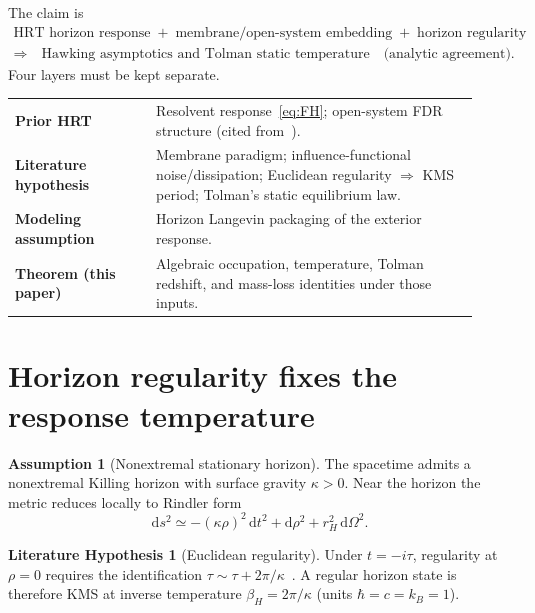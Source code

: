 \documentclass[11pt]{article}
\theoremstyle{definition}
\newtheorem{assumption}[theorem]{Assumption}
\newtheorem{literaturehypothesis}[theorem]{Literature Hypothesis}
\theoremstyle{remark}
\newcommand{\dd}{\mathrm{d}}
\begin{document}
The claim is
\begin{equation}
\label{eq:claim}
\boxed{\begin{gathered}
\text{HRT horizon response}
\;+\;
\text{membrane/open-system embedding}
\;+\;
\text{horizon regularity}\\
\Longrightarrow\quad
\text{Hawking asymptotics and Tolman static temperature}
\quad\text{(analytic agreement).}
\end{gathered}}
\end{equation}
Four layers must be kept separate.
\begin{center}
\begin{tabular}{@{}>{\bfseries}p{0.28\linewidth}p{0.64\linewidth}@{}}
\toprule
Prior HRT & Resolvent response~\eqref{eq:FH}; open-system FDR structure
(cited from~\cite{boyd2026response}).\\
Literature hypothesis & Membrane paradigm; influence-functional noise/dissipation;
Euclidean regularity $\Rightarrow$ KMS period; Tolman's static equilibrium law.\\
Modeling assumption & Horizon Langevin packaging of the exterior response.\\
Theorem (this paper) & Algebraic occupation, temperature, Tolman redshift, and
mass-loss identities under those inputs.\\
\bottomrule
\end{tabular}
\end{center}

\section{Horizon regularity fixes the response temperature}
\label{sec:geometry}
\begin{assumption}[Nonextremal stationary horizon]
\label{ass:horizon}
The spacetime admits a nonextremal Killing horizon with surface gravity $\kappa>0$.
Near the horizon the metric reduces locally to Rindler form
\begin{equation}
\label{eq:rindler}
\dd s^2\simeq-(\kappa\rho)^2\,\dd t^2+\dd\rho^2+r_H^2\,\dd\Omega^2.
\end{equation}
\end{assumption}

\begin{literaturehypothesis}[Euclidean regularity]
\label{lit:period}
Under $t=-i\tau$, regularity at $\rho=0$ requires the identification
$\tau\sim\tau+2\pi/\kappa$~\cite{Hawking1975,Unruh1976}.
A regular horizon state is therefore KMS at inverse temperature
$\beta_H=2\pi/\kappa$ (units $\hbar=c=k_B=1$).
\end{literaturehypothesis}
\end{document}
